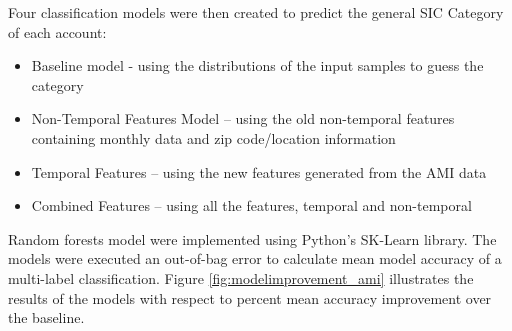 Four classification models were then created to predict the general SIC Category of each account:
\begin{itemize}
\item Baseline model - using the distributions of the input samples to guess the category
\item Non-Temporal Features Model – using the old non-temporal features containing monthly data and zip code/location information
\item Temporal Features – using the new features generated from the AMI data
\item Combined Features – using all the features, temporal and non-temporal
\end{itemize}

Random forests model were implemented using Python’s SK-Learn library. The models were executed an out-of-bag error to calculate mean model accuracy of a multi-label classification. Figure \ref{fig:modelimprovement_ami} illustrates the results of the models with respect to percent mean accuracy improvement over the baseline.
